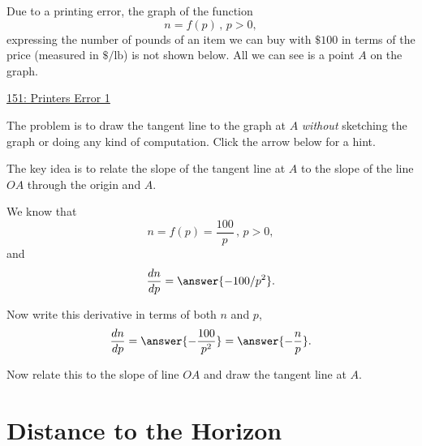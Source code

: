 \documentclass{ximera}
\begin{document}
\begin{question} \label{QGETGG3fg44}
Due to a printing error, the graph of the function
\[
      n = f(p)  \, , \, p>0 ,
\]
expressing the number of pounds of an item we can buy with $\$100$ in terms of the price (measured in $\$/\text{lb}$) is not shown below. All we can see is a point $A$ on the graph.

\begin{onlineOnly}
    \begin{center}
\end{center}
\end{onlineOnly}

\href{https://www.desmos.com/calculator/y5nqs8fkvj}{151: Printers Error 1}

The problem is to draw the tangent line to the graph at $A$ \emph{without} sketching the graph or doing any kind of computation. Click the arrow below for a hint.

\begin{expandable}
The key idea is to relate the slope of the tangent line at $A$ to the slope of the line $OA$ through the origin and $A$.


We know that
\[
      n = f(p)  = \frac{100}{p} \, , \, p>0 ,
\]
and
\[
 \frac{dn}{dp} =\answer{-100/p^2} .
\]

Now write this derivative in terms of both $n$ and $p$, 
\[
   \frac{dn}{dp} =\answer{-\frac{100}{p^2}} = \answer{-\frac{n}{p}} .
\]

Now relate this to the slope of line $OA$ and draw the tangent line at $A$.

\end{expandable}

\end{question}


\section{Distance to the Horizon}
\end{document}
